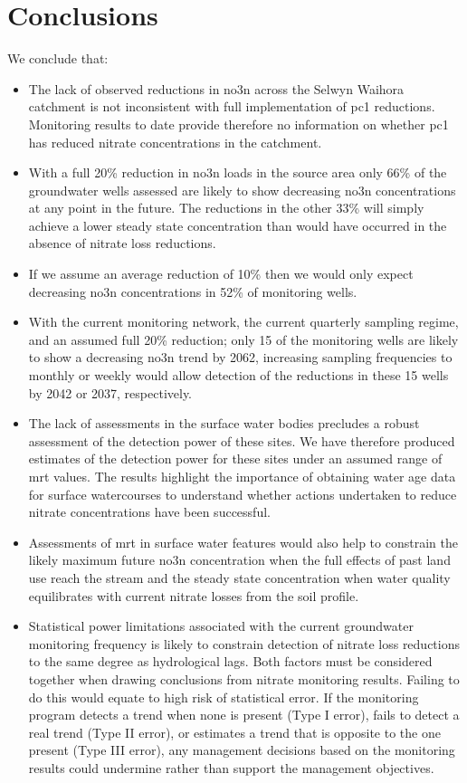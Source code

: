 
\section[Conclusions]{Conclusions} \label{sec:conclusions}

We conclude that:
\begin{itemize}
    \item The lack of observed reductions in \gls{no3n} across the Selwyn Waihora catchment is not inconsistent with full implementation of \gls{pc1} reductions. Monitoring results to date provide therefore no information on whether \gls{pc1} has reduced nitrate concentrations in the catchment.
    \item With a full 20\% reduction in \gls{no3n} loads in the source area only 66\% of the groundwater wells assessed are likely to show decreasing \gls{no3n} concentrations at any point in the future. The reductions in the other 33\% will simply achieve a lower steady state concentration than would have occurred in the absence of nitrate loss reductions.
    \item If we assume an average reduction of 10\% then we would only expect decreasing \gls{no3n} concentrations in 52\% of monitoring wells.
    \item With the current monitoring network, the current quarterly sampling regime, and an assumed full 20\% reduction; only 15 of the monitoring wells are likely to show a decreasing \gls{no3n} trend by 2062, increasing sampling frequencies to monthly or weekly would allow detection of the reductions in these 15 wells by 2042 or 2037, respectively.
    \item The lack of  assessments in the surface water bodies precludes a robust assessment of the detection power of these sites. We have therefore produced estimates of the detection power for these sites under an assumed range of \gls{mrt} values. The results highlight the importance of obtaining water age data for surface watercourses to understand whether actions undertaken to reduce nitrate concentrations have been successful.
    \item Assessments of \gls{mrt} in surface water features would also help to constrain the likely maximum future \gls{no3n} concentration when the full effects of past land use reach the stream and the steady state concentration when water quality equilibrates with current nitrate losses from the soil profile.
    \item Statistical power limitations associated with the current groundwater monitoring frequency is likely to constrain detection of nitrate loss reductions to the same degree as hydrological lags. Both factors must be considered together when drawing conclusions from nitrate monitoring results. Failing to do this would equate to high risk of statistical error. If the monitoring program detects a trend when none is present (Type I error), fails to detect a real trend (Type II error), or estimates a trend that is opposite to the one present (Type III error), any management decisions based on the monitoring results could undermine rather than support the management objectives.

\end{itemize}
